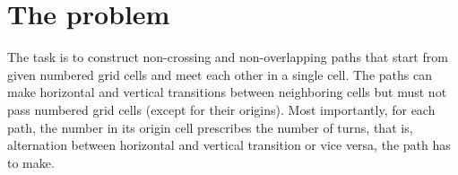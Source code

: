 \section{The problem}
The task is to construct non-crossing and non-overlapping paths that start from given numbered grid cells and meet each other in a single cell. The paths can make horizontal and vertical transitions between neighboring cells but must not pass numbered grid cells (except for their origins). Most importantly, for each path, the number in its origin cell prescribes the number of turns, that is, alternation between horizontal and vertical transition or vice versa, the path has to make. 



